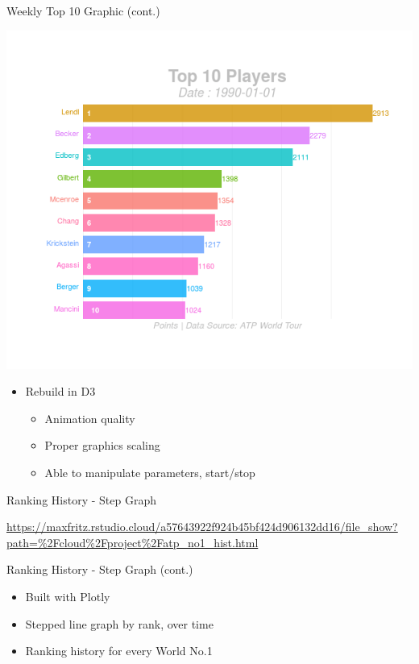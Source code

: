 \documentclass[ignorenonframetext,]{beamer}
\providecommand{\tightlist}{%
  \setlength{\itemsep}{0pt}\setlength{\parskip}{0pt}}
\begin{document}
\begin{frame}{Weekly Top 10 Graphic (cont.)}
\protect\hypertarget{weekly-top-10-graphic-cont.-3}{}

\includegraphics{gganim_test3.gif}

\begin{itemize}[<+->]
\tightlist
\item
  Rebuild in D3

  \begin{itemize}[<+->]
  \tightlist
  \item
    Animation quality
  \item
    Proper graphics scaling
  \item
    Able to manipulate parameters, start/stop
  \end{itemize}
\end{itemize}

\end{frame}

\begin{frame}{Ranking History - Step Graph}
\protect\hypertarget{ranking-history---step-graph}{}

\url{https://maxfritz.rstudio.cloud/a57643922f924b45bf424d906132dd16/file_show?path=\%2Fcloud\%2Fproject\%2Fatp_no1_hist.html}

\end{frame}

\begin{frame}{Ranking History - Step Graph (cont.)}
\protect\hypertarget{ranking-history---step-graph-cont.}{}

\begin{itemize}[<+->]
\tightlist
\item
  Built with Plotly 
\item
  Stepped line graph by rank, over time 
\item
  Ranking history for every World No.1
\end{itemize}

\end{frame}
\end{document}
